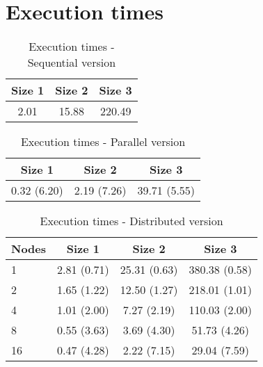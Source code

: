 \documentclass{article}
\begin{document}
\appendix

\section{Execution times} \label{sec:executiontimes}

\begin{table}[H]
\centering
\begin{tabular}{|c|c|c|}
\hline
Size 1 & Size 2 & Size 3 \\
\hline
2.01 & 15.88 & 220.49 \\
\hline
\end{tabular}
\caption{Execution times - Sequential version} \label{tab:sequentialtimes}
\end{table}

\begin{table}[H]
\centering
\begin{tabular}{|c|c|c|}
\hline
Size 1 & Size 2 & Size 3 \\ \hline
0.32 (6.20) & 2.19 (7.26) & 39.71 (5.55) \\ \hline
\end{tabular}
\caption{Execution times - Parallel version} \label{tab:paralleltimes}
\end{table}

\begin{table}[H]
\centering
\begin{tabular}{|l|c|c|c|}
\hline
Nodes & Size 1 & Size 2 & Size 3 \\ \hline
1 & 2.81 (0.71) & 25.31 (0.63) & 380.38 (0.58) \\ \hline
2 & 1.65 (1.22) & 12.50 (1.27) & 218.01 (1.01) \\ \hline
4 & 1.01 (2.00) & 7.27 (2.19) & 110.03 (2.00) \\ \hline
8 & 0.55 (3.63) & 3.69 (4.30) & 51.73 (4.26) \\ \hline
16 & 0.47 (4.28) & 2.22 (7.15) & 29.04 (7.59) \\ \hline
\end{tabular}
\caption{Execution times - Distributed version} \label{tab:distributedtimes}
\end{table}
\end{document}
